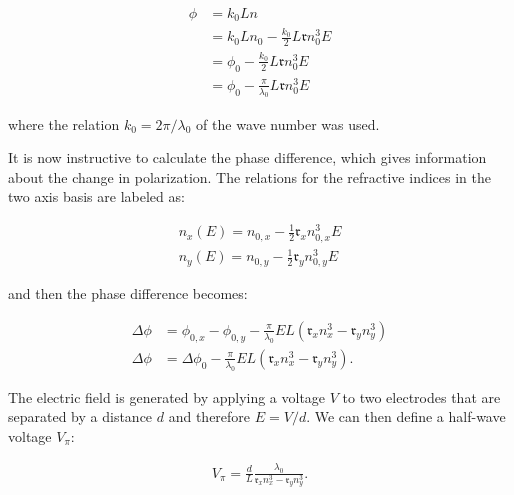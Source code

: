 \begin{align}
	\phi & = k_0 L n \\
		 & = k_0 L n_0 - \frac{k_0}{2} L \mathfrak{r} n_0^3 E \\
		 & = \phi_0 - \frac{k_0}{2} L \mathfrak{r} n_0^3 E \\
		 & = \phi_0 - \frac{\pi}{\lambda_0} L \mathfrak{r} n_0^3 E
\end{align}

where the relation $k_0 = 2 \pi / \lambda_0$ of the wave number was used.

It is now instructive to calculate the phase difference, which gives information about the change in polarization. The relations for the refractive indices in the two axis basis are labeled as:

\begin{align}
	n_x(E) = n_{0,x} - \frac{1}{2} \mathfrak{r}_x n_{0,x}^3 E \\
	n_y(E) = n_{0,y} - \frac{1}{2} \mathfrak{r}_y n_{0,y}^3 E
\end{align}

and then the phase difference becomes:

\begin{align}
	\Delta \phi & = \phi_{0,x} - \phi_{0,y} - \frac{\pi}{\lambda_0} E L \left(\mathfrak{r}_x n_x^3 - \mathfrak{r}_y n_y^3\right) \\
	\Delta \phi & = \Delta \phi_{0} - \frac{\pi}{\lambda_0} E L \left(\mathfrak{r}_x n_x^3 - \mathfrak{r}_y n_y^3\right) .
\end{align}

\begin{figure}[t]
\end{figure}

The electric field is generated by applying a voltage $V$ to two electrodes that are separated by a distance $d$ and therefore $E = V/d$. We can then define a half-wave voltage $V_\pi$:

\begin{align}
	V_\pi = \frac{d}{L} \frac{\lambda_0}{\mathfrak{r}_x n_x^3 - \mathfrak{r}_y n_y^3}.
\end{align}

